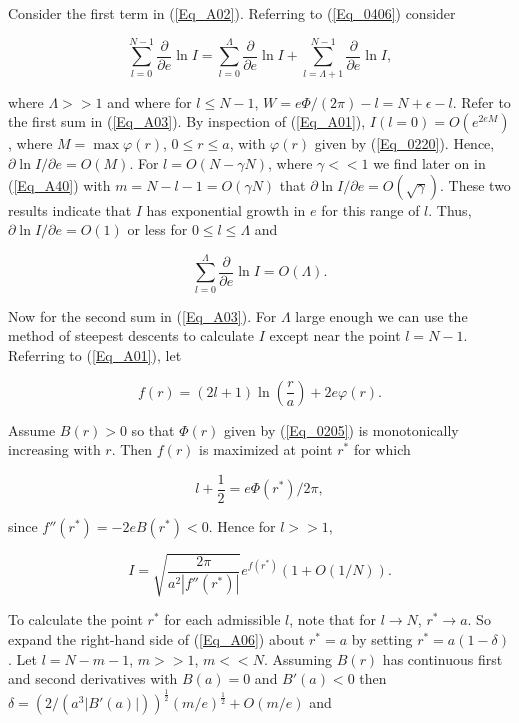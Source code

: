 \documentclass[a4paper,twocolumn,showpacs,preprintnumbers,amsmath,amssymb]{revtex4}
\newcommand{\half}{\frac{1}{2}}
\newcommand{\pdo}[1]{\ensuremath{\frac{\partial }
        {\partial #1 }}}
\begin{document}
\noindent
Consider the first term in (\ref{Eq_A02}). Referring to (\ref{Eq_0406})
consider

\begin{equation}
\label{Eq_A03}
\sum^{N-1}_{l=0} \pdo{e} \ln I
  = \sum^{\Lambda}_{l=0} \pdo{e} \ln I
    + \sum^{N-1}_{l=\Lambda + 1} \pdo{e} \ln I,
\end{equation}

\noindent
where $\Lambda >> 1$ and where for $l \leq N-1$,
$W = e\Phi / (2\pi) - l = N + \epsilon - l$. Refer to the first sum
in (\ref{Eq_A03}). By inspection of (\ref{Eq_A01}),
$I(l=0) = O(e^{2eM})$, where $M = \max \varphi(r)$, $0 \le r \le a$,
with $\varphi(r)$ given by (\ref{Eq_0220}). Hence,
$\partial \ln I / \partial e = O(M)$. For $l = O(N - \gamma N)$, where
$\gamma << 1$ we find later on in (\ref{Eq_A40}) with
$m = N-l-1 = O(\gamma N)$ that
$\partial\ln I / \partial e = O(\sqrt{\gamma})$. These two results
indicate that $I$ has exponential growth in $e$ for this range of
$l$. Thus, $\partial\ln I / \partial e = O(1)$ or less for
$0 \le l \le \Lambda$ and

\begin{equation}
\label{Eq_A04}
\sum^{\Lambda}_{l=0} \pdo{e} \ln I = O(\Lambda).
\end{equation} 

Now for the second sum in (\ref{Eq_A03}). For $\Lambda$ large enough
we can use the method of steepest descents to calculate $I$ except
near the point $l=N-1$. Referring to (\ref{Eq_A01}), let

\begin{equation}
\label{Eq_A05}
f(r) = (2l+1) \ln \left(\frac{r}{a}\right) + 2e \varphi(r).
\end{equation}

\noindent
Assume $B(r) > 0$ so that $\Phi(r)$ given by (\ref{Eq_0205}) is
monotonically increasing with $r$. Then $f(r)$ is maximized at point
$r^{*}$ for which

\begin{equation}
\label{Eq_A06}
l + \half = e\Phi(r^{*}) / 2\pi,
\end{equation}

\noindent
since $f''(r^{*}) = -2eB(r^{*}) < 0$. Hence for $l>>1$,

\begin{equation}
\label{Eq_A07}
I = \sqrt{\frac{2\pi}{a^2|f''(r^{*})|}} e^{f(r^{*})} (1 + O(1/N)).
\end{equation}

\noindent
To calculate the point $r^{*}$ for each admissible $l$, note that for
$l \to N$, $r^{*} \to a$. So expand the right-hand side of
(\ref{Eq_A06}) about $r^{*} = a$ by setting $r^{*} = a (1 - \delta)$. 
Let $l = N-m-1$, $m >> 1$, $m << N$. Assuming $B(r)$ has continuous
first and second derivatives with $B(a) = 0$ and $B'(a) < 0$ then
$\delta = (2 / (a^3 |B'(a)|))^{\half} (m/e)^{\half} + O(m/e)$ and
\end{document}
